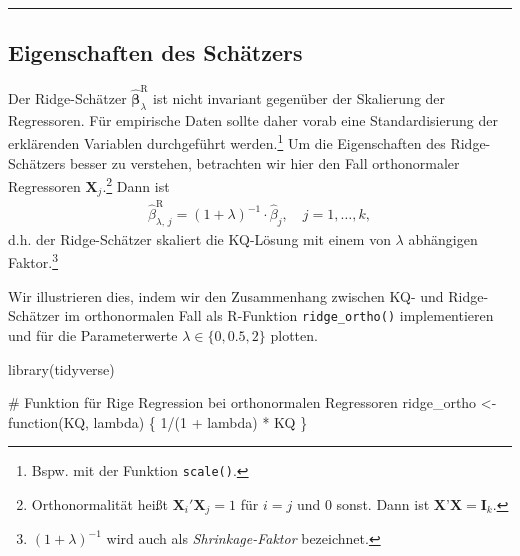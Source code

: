 \documentclass[
  a4paper,
  DIV=11,
  oneside]{scrreprt}
\newenvironment{Shaded}{\begin{snugshade}}{\end{snugshade}}
\newcommand{\CommentTok}[1]{\textcolor[rgb]{0.37,0.37,0.37}{#1}}
\newcommand{\ControlFlowTok}[1]{\textcolor[rgb]{0.00,0.23,0.31}{#1}}
\newcommand{\DecValTok}[1]{\textcolor[rgb]{0.68,0.00,0.00}{#1}}
\newcommand{\FunctionTok}[1]{\textcolor[rgb]{0.28,0.35,0.67}{#1}}
\newcommand{\NormalTok}[1]{\textcolor[rgb]{0.00,0.23,0.31}{#1}}
\newcommand{\OtherTok}[1]{\textcolor[rgb]{0.00,0.23,0.31}{#1}}
\newcommand{\SpecialCharTok}[1]{\textcolor[rgb]{0.37,0.37,0.37}{#1}}
\begin{document}
\begin{center}\rule{0.5\linewidth}{0.5pt}\end{center}

\hypertarget{eigenschaften-des-schuxe4tzers}{%
\subsection{Eigenschaften des
Schätzers}\label{eigenschaften-des-schuxe4tzers}}

Der Ridge-Schätzer \(\widehat{\boldsymbol{\beta}}^{\mathrm{R}}_\lambda\)
ist nicht invariant gegenüber der Skalierung der Regressoren. Für
empirische Daten sollte daher vorab eine Standardisierung der
erklärenden Variablen durchgeführt werden.\footnote{Bspw. mit der
  Funktion \texttt{scale()}.} Um die Eigenschaften des Ridge-Schätzers
besser zu verstehen, betrachten wir hier den Fall orthonormaler
Regressoren \(\boldsymbol{X}_j\).\footnote{Orthonormalität heißt
  \(\boldsymbol{X}_i'\boldsymbol{X}_j = 1\) für \(i=j\) und \(0\) sonst.
  Dann ist \(\boldsymbol{X}\)'\(\boldsymbol{X} = \boldsymbol{I}_k\).}
Dann ist \begin{align}
  \widehat{\beta}^{\mathrm{R}}_{\lambda,\,j} = (1+\lambda)^{-1} \cdot\widehat{\beta}_j,\quad j = 1,\dots,k,\label{eq:ridgeortho}
\end{align} d.h. der Ridge-Schätzer skaliert die KQ-Lösung mit einem von
\(\lambda\) abhängigen Faktor.\footnote{\((1+\lambda)^{-1}\) wird auch
  als \emph{Shrinkage-Faktor} bezeichnet.}

Wir illustrieren dies, indem wir den Zusammenhang zwischen KQ- und
Ridge-Schätzer im orthonormalen Fall als R-Funktion
\texttt{ridge\_ortho()} implementieren und für die Parameterwerte
\(\lambda\in\{0,0.5,2\}\) plotten.

\begin{Shaded}
\begin{Highlighting}[]
\FunctionTok{library}\NormalTok{(tidyverse)}

\CommentTok{\# Funktion für Rige Regression bei orthonormalen Regressoren}
\NormalTok{ridge\_ortho }\OtherTok{\textless{}{-}} \ControlFlowTok{function}\NormalTok{(KQ, lambda) \{}
  \DecValTok{1}\SpecialCharTok{/}\NormalTok{(}\DecValTok{1} \SpecialCharTok{+}\NormalTok{ lambda) }\SpecialCharTok{*}\NormalTok{ KQ}
\NormalTok{\}}
\end{Highlighting}
\end{Shaded}
\end{document}
